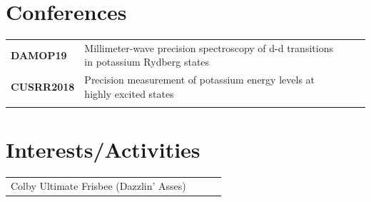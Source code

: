 \documentclass[a4paper, 10.5pt]{article}
\begin{document}
	\section*{\normalsize{{\color{colby}Conferences}}}
		\begin{tabular}{lp{13.5cm}lp{8in}}
			\textbf{DAMOP19} & Millimeter-wave precision spectroscopy of d-d transitions in potassium Rydberg states \\
			\textbf{CUSRR2018} & Precision measurement of potassium energy levels at highly excited states\\\\
		\end{tabular}
	
	\section*{\normalsize{{\color{colby}Interests/Activities}}}
		\begin{tabular}{lp{4in}lp{8in}}
			Colby Ultimate Frisbee (Dazzlin' Asses)
		\end{tabular}
\end{document}
